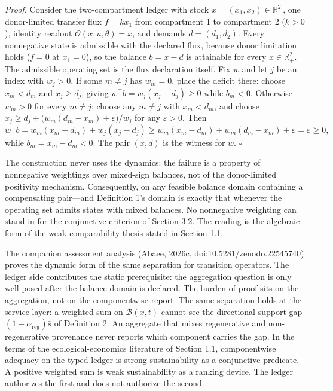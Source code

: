 \documentclass[11pt]{article}
\begin{document}
\emph{Proof.} Consider the two-compartment ledger with stock \(x = (x_1, x_2) \in \mathbb{R}^2_+\), one donor-limited transfer flux \(f = kx_1\) from compartment 1 to compartment 2 (\(k > 0\)), identity readout \(\mathcal{O}(x, u, \theta) = x\), and demands \(d = (d_1, d_2)\). Every nonnegative state is admissible with the declared flux, because donor limitation holds (\(f = 0\) at \(x_1 = 0\)), so the balance \(b = x - d\) is attainable for every \(x \in \mathbb{R}^2_+\). The admissible operating set is the flux declaration itself. Fix \(w\) and let \(j\) be an index with \(w_j > 0\). If some \(m \neq j\) has \(w_m = 0\), place the deficit there: choose \(x_m < d_m\) and \(x_j \ge d_j\), giving \(w^\top b = w_j (x_j - d_j) \ge 0\) while \(b_m < 0\). Otherwise \(w_m > 0\) for every \(m \neq j\): choose any \(m \neq j\) with \(x_m < d_m\), and choose \(x_j \ge d_j + \bigl( w_m (d_m - x_m) + \varepsilon \bigr)/w_j\) for any \(\varepsilon > 0\). Then \[w^\top b = w_m (x_m - d_m) + w_j (x_j - d_j) \ge w_m (x_m - d_m) + w_m (d_m - x_m) + \varepsilon = \varepsilon \ge 0,\] while \(b_m = x_m - d_m < 0\). The pair \((x, d)\) is the witness for \(w\). \ensuremath{\square}

The construction never uses the dynamics: the failure is a property of nonnegative weightings over mixed-sign balances, not of the donor-limited positivity mechanism. Consequently, on any feasible balance domain containing a compensating pair---and Definition 1's domain is exactly that whenever the operating set admits states with mixed balances. No nonnegative weighting can stand in for the conjunctive criterion of Section 3.2. The reading is the algebraic form of the weak-comparability thesis stated in Section 1.1.

The companion assessment analysis (Abaee, 2026c, doi:10.5281/\allowbreak{}zenodo.22545740) proves the dynamic form of the same separation for transition operators. The ledger side contributes the static prerequisite: the aggregation question is only well posed after the balance domain is declared. The burden of proof sits on the aggregation, not on the componentwise report. The same separation holds at the service layer: a weighted sum on \(\mathcal{B}(x,t)\) cannot see the directional support gap \((1 - \alpha_{\mathrm{reg}})\bar s\) of Definition 2. An aggregate that mixes regenerative and non-regenerative provenance never reports which component carries the gap. In the terms of the ecological-economics literature of Section 1.1, componentwise adequacy on the typed ledger is strong sustainability as a conjunctive predicate. A positive weighted sum is weak sustainability as a ranking device. The ledger authorizes the first and does not authorize the second.
\end{document}
